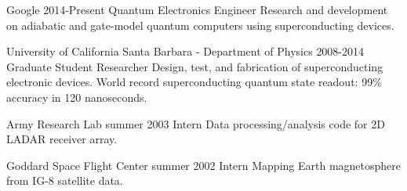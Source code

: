 \job
{Google}
{2014-Present}
{Quantum Electronics Engineer}
{Research and development on adiabatic and gate-model quantum computers using superconducting devices.}

\job
{University of California Santa Barbara - Department of Physics}
{2008-2014}
{Graduate Student Researcher}
{Design, test, and fabrication of superconducting electronic devices.
World record superconducting quantum state readout:
99\% accuracy in 120 nanoseconds.}

\job
{Army Research Lab}
{summer 2003}
{Intern}
{Data processing/analysis code for 2D LADAR receiver array.}

\job
{ Goddard Space Flight Center}
{summer 2002}
{Intern}
{Mapping Earth magnetosphere from IG-8 satellite data.}
